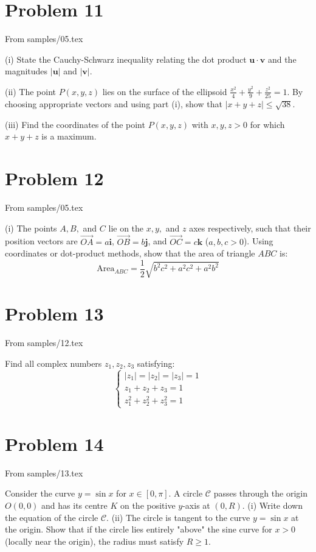 \section{Problem 11}
From samples/05.tex

(i) State the Cauchy-Schwarz inequality relating the dot product $\mathbf{u} \cdot \mathbf{v}$ and the magnitudes $|\mathbf{u}|$ and $|\mathbf{v}|$.

(ii) The point $P(x, y, z)$ lies on the surface of the ellipsoid $\frac{x^2}{4} + \frac{y^2}{9} + \frac{z^2}{25} = 1$. By choosing appropriate vectors and using part (i), show that $|x + y + z| \le \sqrt{38}$.

(iii) Find the coordinates of the point $P(x,y,z)$ with $x,y,z > 0$ for which $x+y+z$ is a maximum.

\section*{Problem 12}
From samples/05.tex

(i) The points $A, B,$ and $C$ lie on the $x, y,$ and $z$ axes respectively, such that their position vectors are $\vec{OA} = a\mathbf{i}$, $\vec{OB} = b\mathbf{j}$, and $\vec{OC} = c\mathbf{k}$ ($a,b,c > 0$).
Using coordinates or dot-product methods, show that the area of triangle $ABC$ is:
\[ \text{Area}_{ABC} = \frac{1}{2} \sqrt{b^2 c^2 + a^2 c^2 + a^2 b^2} \]

\section*{Problem 13}
From samples/12.tex

Find all complex numbers $z_1, z_2, z_3$ satisfying:
\[
\begin{cases}
    |z_1| = |z_2| = |z_3| = 1 \\
    z_1 + z_2 + z_3 = 1 \\
    z_1^2 + z_2^2 + z_3^2 = 1
\end{cases}
\]

\section*{Problem 14}
From samples/13.tex

Consider the curve $y = \sin x$ for $x \in [0, \pi]$. A circle $\mathcal{C}$ passes through the origin $O(0,0)$ and has its centre $K$ on the positive $y$-axis at $(0, R)$.
(i) Write down the equation of the circle $\mathcal{C}$.
(ii) The circle is tangent to the curve $y = \sin x$ at the origin. Show that if the circle lies entirely "above" the sine curve for $x > 0$ (locally near the origin), the radius must satisfy $R \ge 1$.

